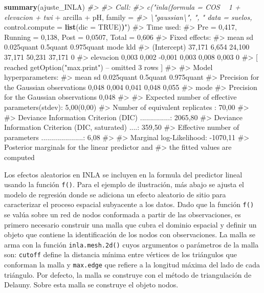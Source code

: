 \documentclass[11pt,b5paper,]{krantz}
\newenvironment{Shaded}{}{}
\newcommand{\CommentTok}[1]{\textcolor[rgb]{0.38,0.63,0.69}{\textit{#1}}}
\newcommand{\DataTypeTok}[1]{\textcolor[rgb]{0.56,0.13,0.00}{#1}}
\newcommand{\ErrorTok}[1]{\textcolor[rgb]{1.00,0.00,0.00}{\textbf{#1}}}
\newcommand{\KeywordTok}[1]{\textcolor[rgb]{0.00,0.44,0.13}{\textbf{#1}}}
\newcommand{\NormalTok}[1]{#1}
\newcommand{\OperatorTok}[1]{\textcolor[rgb]{0.40,0.40,0.40}{#1}}
\newcommand{\OtherTok}[1]{\textcolor[rgb]{0.00,0.44,0.13}{#1}}
\newcommand{\StringTok}[1]{\textcolor[rgb]{0.25,0.44,0.63}{#1}}
\begin{document}
\begin{Shaded}
\begin{Highlighting}[]
\KeywordTok{summary}\NormalTok{(ajuste_INLA)}
\CommentTok{#>}
\CommentTok{#> Call:}
\CommentTok{#> c("inla(formula = COS ~ 1 + elevacion + twi}
\OperatorTok{+}\StringTok{ }\NormalTok{arcilla }\OperatorTok{+}\StringTok{ }\NormalTok{pH, family =}
\CommentTok{#> \textbackslash{}"gaussian\textbackslash{}", ", " data = suelos,}
\NormalTok{control.compute =}\StringTok{ }\KeywordTok{list}\NormalTok{(}\DataTypeTok{dic =} \OtherTok{TRUE}\NormalTok{)}\ErrorTok{)}\StringTok{")}
\StringTok{#> Time used:}
\StringTok{#> Pre = 0,417, Running = 0,138, Post = 0,0507,}
\StringTok{Total = 0,606}
\StringTok{#> Fixed effects:}
\StringTok{#> mean sd 0.025quant 0.5quant 0.975quant mode}
\StringTok{kld}
\StringTok{#> (Intercept) 37,171 6,654 24,100 37,171}
\StringTok{50,231 37,171 0}
\StringTok{#> elevacion 0,003 0,002 -0,001 0,003 0,008}
\StringTok{0,003 0}
\StringTok{#> [ reached getOption("}\NormalTok{max.print}\StringTok{") -- omitted}
\StringTok{3 rows ]}
\StringTok{#>}
\StringTok{#> Model hyperparameters:}
\StringTok{#> mean sd 0.025quant 0.5quant 0.975quant}
\StringTok{#> Precision for the Gaussian observations}
\StringTok{0,048 0,004 0,041 0,048 0,055}
\StringTok{#> mode}
\StringTok{#> Precision for the Gaussian observations}
\StringTok{0,048}
\StringTok{#>}
\StringTok{#> Expected number of effective}
\StringTok{parameters(stdev): 5,00(0,00)}
\StringTok{#> Number of equivalent replicates : 70,00}
\StringTok{#>}
\StringTok{#> Deviance Information Criterion (DIC)}
\StringTok{...............: 2065,80}
\StringTok{#> Deviance Information Criterion (DIC,}
\StringTok{saturated) ....: 359,50}
\StringTok{#> Effective number of parameters}
\StringTok{.....................: 6,08}
\StringTok{#>}
\StringTok{#> Marginal log-Likelihood: -1070,11}
\StringTok{#> Posterior marginals for the linear predictor}
\StringTok{and}
\StringTok{#> the fitted values are computed}
\end{Highlighting}
\end{Shaded}

Los efectos aleatorios en INLA se incluyen en la formula del predictor lineal usando la función \texttt{f()}. Para el ejemplo de ilustración, más abajo se ajusta el modelo de regresión donde se adiciona un efecto aleatorio de sitio para caracterizar el proceso espacial subyacente a los datos. Dado que la función \texttt{f()} se valúa sobre un red de nodos conformada a partir de las observaciones, es primero necesario construir una malla que cubra el dominio espacial y definir un objeto que contiene la identificación de los nodos con observaciones. La malla se arma con la función \texttt{inla.mesh.2d()} cuyos argumentos o parámetros de la malla son: \texttt{cutoff} define la distancia mínima entre vértices de los triángulos que conforman la malla y \texttt{max.edge} que refiere a la longitud máxima del lado de cada triángulo. Por defecto, la malla se construye con el método de triangulación de Delauny. Sobre esta malla se construye el objeto nodos.
\end{document}
